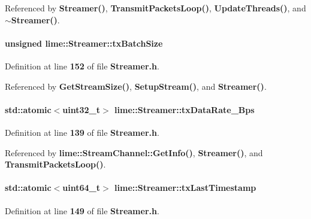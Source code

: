 Referenced by {\bf Streamer()}, {\bf Transmit\+Packets\+Loop()}, {\bf Update\+Threads()}, and {\bf $\sim$\+Streamer()}.

\paragraph[{tx\+Batch\+Size}]{\setlength{\rightskip}{0pt plus 5cm}unsigned lime\+::\+Streamer\+::tx\+Batch\+Size}\label{classlime_1_1Streamer_ac3f56ce0e84b1556b77bf6a081e2fe09}


Definition at line {\bf 152} of file {\bf Streamer.\+h}.



Referenced by {\bf Get\+Stream\+Size()}, {\bf Setup\+Stream()}, and {\bf Streamer()}.

\paragraph[{tx\+Data\+Rate\+\_\+\+Bps}]{\setlength{\rightskip}{0pt plus 5cm}std\+::atomic$<$uint32\+\_\+t$>$ lime\+::\+Streamer\+::tx\+Data\+Rate\+\_\+\+Bps}\label{classlime_1_1Streamer_af0888ee52ab1dd461c8dd15f5d20182c}


Definition at line {\bf 139} of file {\bf Streamer.\+h}.



Referenced by {\bf lime\+::\+Stream\+Channel\+::\+Get\+Info()}, {\bf Streamer()}, and {\bf Transmit\+Packets\+Loop()}.

\paragraph[{tx\+Last\+Timestamp}]{\setlength{\rightskip}{0pt plus 5cm}std\+::atomic$<$uint64\+\_\+t$>$ lime\+::\+Streamer\+::tx\+Last\+Timestamp}\label{classlime_1_1Streamer_ad6489237eecb85f84c4fdc9a4619a648}


Definition at line {\bf 149} of file {\bf Streamer.\+h}.



